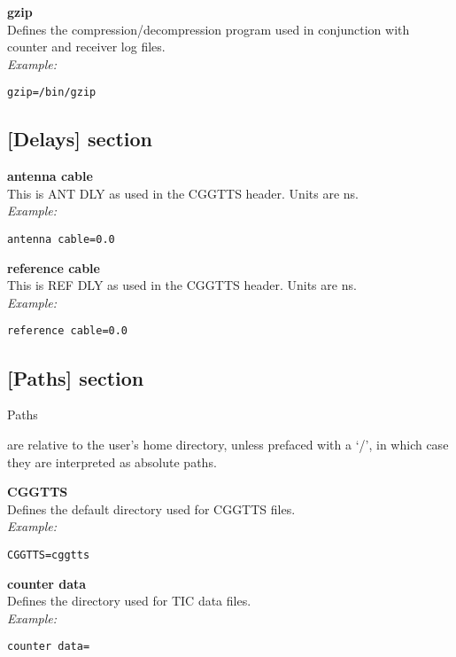 \hypertarget{h:misc}{}

{\bfseries gzip}\\
Defines the compression/decompression program used in conjunction with counter and receiver log files.\\
\textit{Example:}
\begin{lstlisting}
gzip=/bin/gzip 
\end{lstlisting}

\subsection{[Delays] section}

\hypertarget{h:delays}{}

{\bfseries antenna cable}\\
This is ANT DLY as used in the CGGTTS header. Units are ns.\\
\textit{Example:}
\begin{lstlisting}
antenna cable=0.0
\end{lstlisting}

{\bfseries reference cable}\\
This is REF DLY as used in the CGGTTS header. Units are ns.\\
\textit{Example:}
\begin{lstlisting}
reference cable=0.0
\end{lstlisting}

\subsection{[Paths] section}

\hypertarget{h:paths}{Paths} are relative to the user's home directory, unless prefaced with a `/', in which case
they are interpreted as absolute paths.

{\bfseries CGGTTS}\\
Defines the default directory used for CGGTTS files.\\
\textit{Example:}
\begin{lstlisting}
CGGTTS=cggtts
\end{lstlisting}

{\bfseries counter data}\\
Defines the directory used for TIC data files.\\
\textit{Example:}
\begin{lstlisting}
counter data=
\end{lstlisting}

